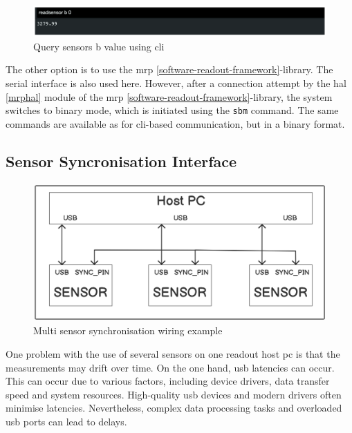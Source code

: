 \begin{figure}
\centering
\includegraphics{./generated_images/border_Query_sensors_b_value_using_(+cli).png}
\caption{Query sensors b value using \gls{cli}
\label{Query_sensors_b_value_using_(+cli).png}}
\end{figure}

The other option is to use the \gls{mrp}
\ref{software-readout-framework}-library. The serial interface is also
used here. However, after a connection attempt by the \gls{hal}
\ref{mrphal} module of the \gls{mrp}
\ref{software-readout-framework}-library, the system switches to binary
mode, which is initiated using the \passthrough{\lstinline!sbm!}
command. The same commands are available as for \gls{cli}-based
communication, but in a binary format.

\hypertarget{sensor-syncronisation-interface}{%
\subsection{Sensor Syncronisation
Interface}\label{sensor-syncronisation-interface}}

\begin{figure}
\centering
\includegraphics{./generated_images/border_Multi_sensor_synchronisation_wiring_example.png}
\caption{Multi sensor synchronisation wiring example
\label{Multi_sensor_synchronisation_wiring_example.png}}
\end{figure}

One problem with the use of several sensors on one readout host \gls{pc}
is that the measurements may drift over time. On the one hand, \gls{usb}
latencies can occur. This can occur due to various factors, including
device drivers, data transfer speed and system resources. High-quality
\gls{usb} devices and modern drivers often minimise latencies.
Nevertheless, complex data processing tasks and overloaded \gls{usb}
ports can lead to delays.

